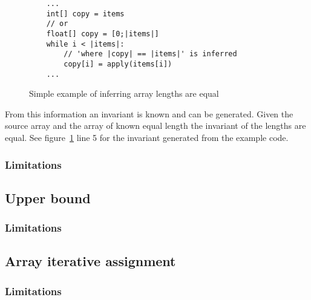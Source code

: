 \begin{figure}[ht]
\begin{lstlisting}
    ...
    int[] copy = items
    // or
    float[] copy = [0;|items|]
    while i < |items|:
        // 'where |copy| == |items|' is inferred
        copy[i] = apply(items[i])
    ...
\end{lstlisting}
\caption{Simple example of inferring array lengths are equal}
\label{lst:whiley-length}
\end{figure}

From this information an invariant is known and can be generated.
Given the source array and the array of known equal length the
invariant of the lengths are equal.
See figure~\ref{lst:whiley-length} line 5 for the invariant generated
from the example code.


\subsubsection{Limitations}

\subsection{Upper bound}


\subsubsection{Limitations}

\subsection{Array iterative assignment}


\subsubsection{Limitations}
